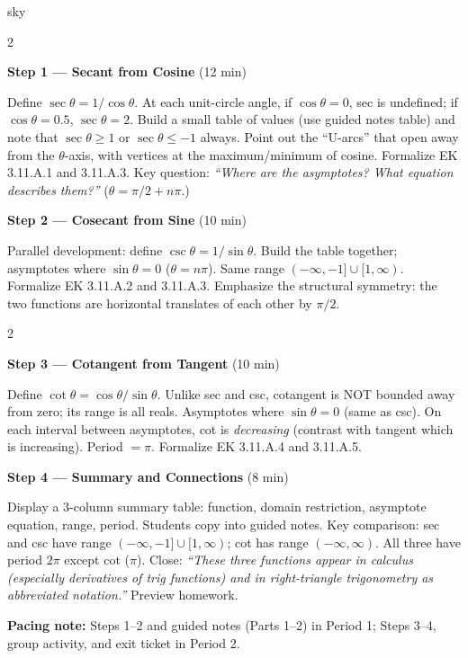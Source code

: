 \documentclass[10pt]{article}
\begin{document}
\begin{skillbox}{sky}
\begin{multicols}{2}

\textbf{Step 1 --- Secant from Cosine} (12 min)

Define $\sec\theta = 1/\cos\theta$. At each unit-circle angle, if
$\cos\theta = 0$, sec is undefined; if $\cos\theta = 0.5$, $\sec\theta = 2$.
Build a small table of values (use guided notes table) and note that
$\sec\theta \geq 1$ or $\sec\theta \leq -1$ always.
Point out the ``U-arcs'' that open away from the $\theta$-axis, with vertices
at the maximum/minimum of cosine. Formalize EK 3.11.A.1 and 3.11.A.3.
Key question: \textit{``Where are the asymptotes? What equation describes them?''}
($\theta = \pi/2 + n\pi$.)

\columnbreak

\textbf{Step 2 --- Cosecant from Sine} (10 min)

Parallel development: define $\csc\theta = 1/\sin\theta$. Build the table
together; asymptotes where $\sin\theta = 0$ ($\theta = n\pi$). Same range
$(-\infty,-1]\cup[1,\infty)$. Formalize EK 3.11.A.2 and 3.11.A.3.
Emphasize the structural symmetry: the two functions are horizontal
translates of each other by $\pi/2$.

\end{multicols}

\begin{multicols}{2}

\textbf{Step 3 --- Cotangent from Tangent} (10 min)

Define $\cot\theta = \cos\theta/\sin\theta$. Unlike sec and csc, cotangent
is NOT bounded away from zero; its range is all reals.
Asymptotes where $\sin\theta = 0$ (same as csc).
On each interval between asymptotes, cot is \emph{decreasing} (contrast with
tangent which is increasing). Period $= \pi$. Formalize EK 3.11.A.4 and 3.11.A.5.

\columnbreak

\textbf{Step 4 --- Summary and Connections} (8 min)

Display a 3-column summary table: function, domain restriction, asymptote
equation, range, period. Students copy into guided notes.
Key comparison: sec and csc have range $(-\infty,-1]\cup[1,\infty)$; cot has
range $(-\infty,\infty)$. All three have period $2\pi$ except cot ($\pi$).
Close: \textit{``These three functions appear in calculus (especially
derivatives of trig functions) and in right-triangle trigonometry as
abbreviated notation.''} Preview homework.

\end{multicols}

\smallskip
\textbf{Pacing note:} Steps 1--2 and guided notes (Parts 1--2) in Period 1;
Steps 3--4, group activity, and exit ticket in Period 2.
\end{skillbox}
\end{document}
